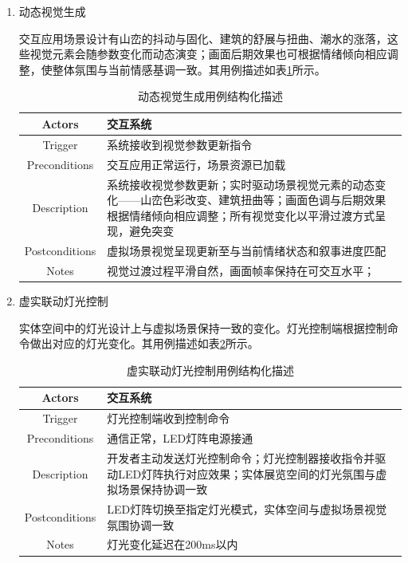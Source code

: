 \documentclass[bachelor]{njupthesis}
\begin{document}
\begin{enumerate}
\item 动态视觉生成

交互应用场景设计有山峦的抖动与固化、建筑的舒展与扭曲、潮水的涨落，这些视觉元素会随参数变化而动态演变；画面后期效果也可根据情绪倾向相应调整，使整体氛围与当前情感基调一致。其用例描述如表\ref{tbl:usecase-visual}所示。

\begin{table}[h]
\centering
\caption{动态视觉生成用例结构化描述}
\begin{tabularx}{\linewidth}{cX}
\toprule
Actors & 交互系统 \\
\midrule
Trigger & 系统接收到视觉参数更新指令 \\
Preconditions & 交互应用正常运行，场景资源已加载 \\
Description & 系统接收视觉参数更新；实时驱动场景视觉元素的动态变化——山峦色彩改变、建筑扭曲等；画面色调与后期效果根据情绪倾向相应调整；所有视觉变化以平滑过渡方式呈现，避免突变 \\
Postconditions & 虚拟场景视觉呈现更新至与当前情绪状态和叙事进度匹配 \\
Notes & 视觉过渡过程平滑自然，画面帧率保持在可交互水平； \\
\bottomrule
\end{tabularx}
\label{tbl:usecase-visual}
\end{table}

\item 虚实联动灯光控制

实体空间中的灯光设计上与虚拟场景保持一致的变化。灯光控制端根据控制命令做出对应的灯光变化。其用例描述如表\ref{tbl:usecase-light}所示。

\begin{table}[h]
\centering
\caption{虚实联动灯光控制用例结构化描述}
\begin{tabularx}{\linewidth}{cX}
\toprule
Actors & 交互系统 \\
\midrule
Trigger & 灯光控制端收到控制命令 \\
Preconditions & 通信正常，LED灯阵电源接通 \\
Description & 开发者主动发送灯光控制命令；灯光控制器接收指令并驱动LED灯阵执行对应效果；实体展览空间的灯光氛围与虚拟场景保持协调一致 \\
Postconditions & LED灯阵切换至指定灯光模式，实体空间与虚拟场景视觉氛围协调一致 \\
Notes & 灯光变化延迟在200ms以内 \\
\bottomrule
\end{tabularx}
\label{tbl:usecase-light}
\end{table}


\end{enumerate}
\end{document}
